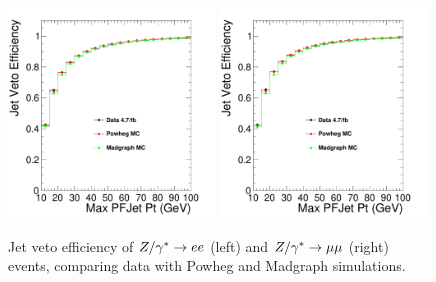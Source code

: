\begin{figure}[htb]
  \begin{center}
   \includegraphics[width=0.49\textwidth]{figures/Zjetvetoeff_ee.pdf}
   \includegraphics[width=0.49\textwidth]{figures/Zjetvetoeff_mm.pdf}
    \caption{Jet veto efficiency of $Z/\gamma^*\to ee$ (left) and $Z/\gamma^*\to\mu\mu$ (right) events, 
    comparing data with Powheg and Madgraph simulations.}
    \label{fig:zJetVetoEff}
  \end{center}
\end{figure}



